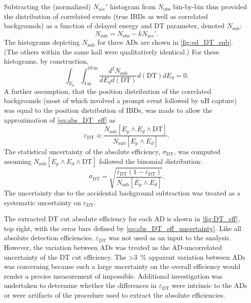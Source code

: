 Subtracting the (normalized) $N_\text{acc}'$ histogram from $N_\text{obs}$ bin-by-bin
thus provided the distribution of correlated events
(true IBDs as well as correlated backgrounds)
as a function of delayed energy and DT parameter,
denoted $N_\text{sub}$:
\begin{equation}\label{eq:DT_eff_nsub}
    N_\text{sub} = N_\text{obs} - kN_\text{acc}'.
\end{equation}
The histograms depicting $N_\text{sub}$ for three ADs
are shown in \cref{fig:ed_DT_sub}.
(The others within the same hall were qualitatively identical.)
For these histograms, by construction,
\begin{equation}\label{eq:acc_sub_normalized_zero}
    \int_{E_d}\int_{\SI{3}{\m}}^{\SI{10}{\m}}
    \frac{d^2N_\text{sub}}{dE_d d(\text{DT})}
    d(\text{DT}) dE_d
    = 0.
\end{equation}
A further assumption, that the position distribution of the correlated backgrounds
(most of which involved a prompt event followed by nH capture)
was equal to the position distribution of IBDs,
was made to allow the approximation of \cref{eq:abs_DT_eff} as
\begin{equation}\label{eq:abs_DT_eff_approx}
    \varepsilon_{\text{DT}} \approx \frac{
        N_\text{sub}[E_p \wedge E_d \wedge \text{DT}]
    }%
    {
        N_\text{sub}[E_p \wedge E_d]
    }.
\end{equation}
The statistical uncertainty of the absolute efficiency, $\sigma_\text{DT}$,
was computed assuming $N_\text{sub}[E_p \wedge E_d \wedge \text{DT}]$
followed the binomial distribution:
\begin{equation}\label{eq:abs_DT_eff_uncertainty}
    \sigma_\text{DT} = \sqrt{
        \frac{
            \varepsilon_\text{DT}(1 - \varepsilon_\text{DT})
        }{
            N_\text{sub}[E_p \wedge E_d]
        }
    }.
\end{equation}
The uncertainty due to the accidental background subtraction
was treated as a systematic uncertainty on $\varepsilon_\text{DT}$.

The extracted DT cut absolute efficiency for each AD is shown in
\cref{fig:DT_eff}, top right, with the error bars defined by
\cref{eq:abs_DT_eff_uncertainty}.
Like all absolute detection efficiencies,
$\varepsilon_{\text{DT}}$ was not used as an input to the \thetaot{} analysis.
However, the variation between ADs was treated as the AD-uncorrelated uncertainty
of the DT cut efficiency.
The \SI{>3}{\percent} apparent variation between ADs
was concerning because such a large uncertainty on the overall efficiency
would render a precise measurement of \thetaot{} impossible.
Additional investigation was undertaken to
determine whether the differences in $\varepsilon_\text{DT}$ were intrinsic to the ADs
or were artifacts of the procedure
used to extract the absolute efficiencies.

